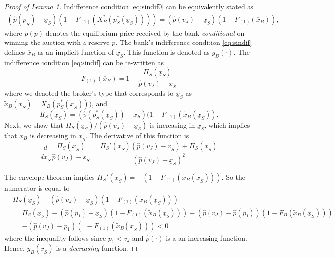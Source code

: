 \documentclass[11pt,twopage]{article}
\newcommand{\ol}{\overline}
\begin{document}
\begin{proof}[Proof of Lemma 1] Indifference condition \eqref{eq:sindif0}  can be equivalently stated as
\begin{align}
  (\hat p(\underline p_S) - \underline x_S)(1-F_{(1)}(X_B^*(p_S^*(\underline x_S)))) = (\hat p(v_J) -
  \underline x_S)(1-F_{(1)}(\overline x_B)), \label{eq:sindif}
\end{align}
where $\hat p(p)$ denotes the equilibrium price received by the bank
\emph{conditional} on winning the auction with a reserve $p$. 
The bank's indifference condition \eqref{eq:sindif} defines $\ol x_B$
as an implicit function of $\underline x_S$.
This function is denoted as $y_B(\cdot)$.  The indifference condition \eqref{eq:sindif}
   can be re-written as
\[
F_{(1)}(\ol x_B)=1-\frac{\Pi_S(\underline x_S)}{\hat p(v_J)-\underline x_S}
\]
where we denoted the broker's type that corresponds to $\underline x_S$ as $\tilde x_B(\underline x_S) =X_B(p_S^*(\underline x_S)))$, and
\[ \Pi_S(\underline x_S) = (\hat
p(p_S^*(\underline x_S))-x_S)(1-F_{(1)}(\tilde x_B(\underline x_S)) .\] 
Next, we show that
$\Pi_S(\underline x_S)/(\hat p(v_J)-\underline x_S)$ is increasing in $\underline x_S$, which
implies that $\ol x_B$ is decreasing in $\underline x_S$. The derivative of this
function is
\[
\frac{d}{d\underline x_S} \frac{\Pi_S(\underline x_S)}{\hat p(v_J)-\underline x_S} = 
\frac{\Pi_S'(\underline x_S)(\hat p(v_J)-\underline x_S)+\Pi_S(\underline x_S)}{(\hat p(v_J)-\underline x_S)^2}
\]

The envelope theorem implies $\Pi_S'(\underline x_S) =
-(1-F_{(1)}(\tilde x_B(\underline x_S)))$. So the numerator is equal to
\begin{align*}
&  \Pi_S(\underline x_S)-(\hat p(v_J)-\underline x_S)(1-F_{(1)}(\tilde x_B(\underline x_S))) \\
& = \Pi_S(\underline x_S)-(\hat p(p_1)-\underline x_S)(1-F_{(1)}(\tilde x_B(\underline x_S))) - (\hat p(v_J)-\hat p(p_1))(1-F_B(\tilde x_B(\underline x_S)))
\\
& = -(\hat p(v_J)-p_1)(1-F_{(1)}(\tilde x_B(\underline x_S))) < 0
\end{align*}
where the inequality follows since $p_1<v_J$ and $\hat p(\cdot)$ is a
an increasing function. Hence, $y_B(\underline x_S)$ is a \emph{decreasing} function.



\end{proof}
\end{document}
